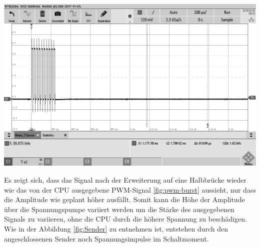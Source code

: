 \begin{minipage}{0.5\textwidth}
\includegraphics[width=1\textwidth, draft]{Abbildungen/PWM-Nach-der-Halbbrucke-mit-LS.png}
\label{fig:Sender}
\end{minipage}
Es zeigt sich, dass das Signal nach der Erweiterung auf eine Halbbrücke wieder wie das von der CPU ausgegebene PWM-Signal \ref{fig:pwm-burst} aussieht, nur dass die Amplitude wie geplant höher ausfällt. Somit kann die Höhe der Amplitude über die Spannungspumpe variiert werden um die Stärke des ausgegebenen Signals zu variieren, ohne die CPU durch die höhere Spannung zu beschädigen.
Wie in der Abbildung \ref{fig:Sender} zu entnehmen ist, entstehen durch den angeschlossenen Sender noch Spannungsimpulse im Schaltmoment.

